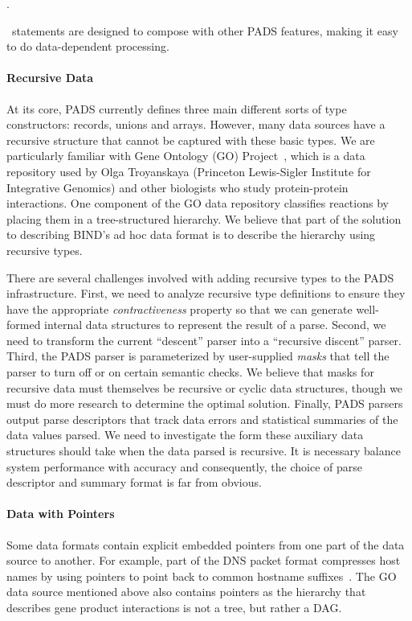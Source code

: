 \documentclass[11pt]{article}
\begin{document}
.  

\Pthen\ statements are designed to compose with other PADS features, making
it easy to do data-dependent processing.

\paragraph*{Recursive Data}
At its core, PADS currently defines three main different sorts of type 
constructors: 
records, unions and arrays.  However, many data sources have a recursive
structure that cannot be captured with these basic types.  We are
particularly familiar with Gene Ontology (GO) Project~\cite{geneontology},
which is a data repository used by Olga Troyanskaya
(Princeton Lewis-Sigler Institute for Integrative Genomics) 
and other biologists who study protein-protein
interactions.  One component of the GO data repository classifies reactions by placing them
in a tree-structured hierarchy.   We believe that part of the solution
to describing BIND's ad hoc data format is to describe the hierarchy
using recursive types.

There are several challenges involved with adding recursive types to the 
PADS infrastructure.  First, we need to analyze recursive type definitions
to ensure they
have the appropriate {\em contractiveness} property so that we can
generate well-formed internal data structures to represent the result of
a parse.  Second,
we need to transform the current ``descent'' parser into
a ``recursive discent'' parser.  Third, the PADS parser is 
parameterized by user-supplied {\em masks} that tell the parser
to turn off or on certain semantic checks.  We believe that
masks for recursive data must themselves be recursive or cyclic
data structures, though we must do more research to determine the
optimal solution.  Finally, PADS parsers output parse descriptors
that track data errors and statistical summaries of the data values
parsed.  We need to investigate the form these auxiliary
data structures should take when the data parsed is recursive. 
It is necessary balance system performance with accuracy
and consequently, the choice of parse descriptor and summary 
format is far from obvious.

\paragraph*{Data with Pointers}
Some data formats contain explicit embedded pointers 
from one part of the data source to another.
For example, part of the DNS packet format compresses
host names by using pointers to point back to common
hostname suffixes~\cite{dns}.  The GO data source
mentioned above also contains pointers as the
hierarchy that describes gene product interactions
is not a tree, but rather a DAG.  
\end{document}
